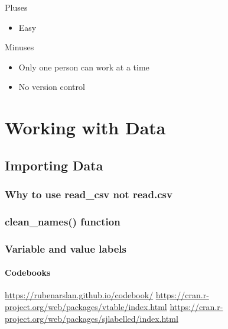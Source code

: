\documentclass[]{book}
\providecommand{\tightlist}{%
  \setlength{\itemsep}{0pt}\setlength{\parskip}{0pt}}
\begin{document}
Pluses

\begin{itemize}
\tightlist
\item
  Easy
\end{itemize}

Minuses

\begin{itemize}
\tightlist
\item
  Only one person can work at a time
\item
  No version control
\end{itemize}

\hypertarget{working-with-data}{%
\chapter{Working with Data}\label{working-with-data}}

\hypertarget{importing-data}{%
\section{Importing Data}\label{importing-data}}

\hypertarget{why-to-use-read_csv-not-read.csv}{%
\subsection{Why to use read\_csv not read.csv}\label{why-to-use-read_csv-not-read.csv}}

\hypertarget{clean_names-function}{%
\subsection{clean\_names() function}\label{clean_names-function}}

\hypertarget{variable-and-value-labels}{%
\subsection{Variable and value labels}\label{variable-and-value-labels}}

\hypertarget{codebooks}{%
\subsubsection{Codebooks}\label{codebooks}}

\url{https://rubenarslan.github.io/codebook/}
\url{https://cran.r-project.org/web/packages/vtable/index.html}
\url{https://cran.r-project.org/web/packages/sjlabelled/index.html}
\end{document}
